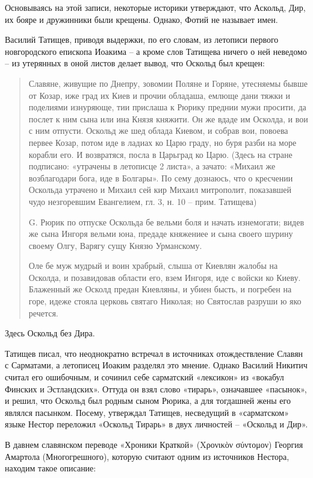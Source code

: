 Основываясь на этой записи, некоторые историки утверждают, что Аскольд, Дир, их бояре и дружинники были крещены. Однако, Фотий не называет имен.

Василий Татищев, приводя выдержки, по его словам, из летописи первого новгородского епископа Иоакима – а кроме слов Татищева ничего о ней неведомо – из утерянных в оной листов делает вывод, что Оскольд был крещен\cite{tatishev01}:

\begin{quotation}
Славяне, живущие по Днепру, зовомии Поляне и Горяне, утесняемы бывше от Козар, иже град их Киев и прочии обладаша, емлюще дани тяжки и поделиями изнуряюще, тии прислаша к Рюрику преднии мужи просити, да послет к ним сына или ина Князя княжити. Он же вдаде им Осколда, и вои с ним отпусти. Оскольд же шед облада Киевом, и собрав вои, повоева первее Козар, потом иде в ладиах ко Царю граду, но буря разби на море корабли его. И возвратяся, посла в Царьград ко Царю. (Здесь на стране подписано: «утрачены в летописце 2 листа», а зачато: «Михаил же возблагодари бога, иде в Болгары». По сему дознаюсь, что о кресчении Оскольда утрачено и Михаил сей кир Михаил митрополит, показавшей чудо незгоревшим Евангелием, гл. 3, н. 10 – прим. Татищева)

G. Рюрик по отпуске Оскольда бе вельми боля и начать изнемогати; видев же сына Ингоря вельми юна, предаде княжениее и сына своего шурину своему Олгу, Варягу сущу Князю Урманскому.

Оле бе муж мудрый и воин храбрый, слыша от Киевлян жалобы на Осколда, и позавидовав области его, взем Ингоря, иде с войски ко Киеву. Блаженный же Осколд предан Киевляны, и убиен бысть, и погребен на горе, идеже стояла церковь святаго Николая; но Святослав разруши ю яко речется.
\end{quotation}

Здесь Оскольд без Дира. 

Татищев писал, что неоднократно встречал в источниках отождествление Славян с Сарматами, а летописец Иоаким разделял это мнение. Однако Василий Никитич считал его ошибочным, и сочинил себе сарматский «лексикон» из «вокабул Финских и Эстландских». Оттуда он взял слово «тирарь», означавшее «пасынок», и решил, что Оскольд был родным сыном Рюрика, а для тогдашней жены его являлся пасынком. Посему, утверждал Татищев, несведущий в «сарматском» языке Нестор переложил «Оскольд Тирарь» в двух личностей – «Оскольд и Дир».

В давнем славянском переводе «Хроники Краткой» (Χρονικ\-ὸν σύντομον) Георгия Амартола (Многогрешного), которую считают одним из источников Нестора, находим такое описание\cite[стр. 511]{amartol01}:


